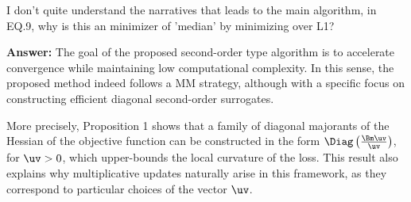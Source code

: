 \documentclass[10pt]{article} %
\newcommand{\answer}[1]{{\textbf{Answer:} \color{blue} #1}}
\begin{document}
I don't quite understand the narratives that leads to the main algorithm, in EQ.9, why is this an minimizer of 'median' by minimizing over L1?

\answer{
The goal of the proposed second-order type algorithm is to accelerate convergence while maintaining low computational complexity. In this sense, the proposed method indeed follows a MM strategy, although with a specific focus on constructing efficient diagonal second-order surrogates.

More precisely, Proposition 1 shows that a family of diagonal majorants of the Hessian of the objective function can be constructed in the form
$\Diag \left(\frac{\Bm\uv}{\uv}\right)$, for $\uv >0$,
which upper-bounds the local curvature of the loss. This result also explains why multiplicative updates naturally arise in this framework, as they correspond to particular choices of the vector $\uv$.





}
\end{document}
